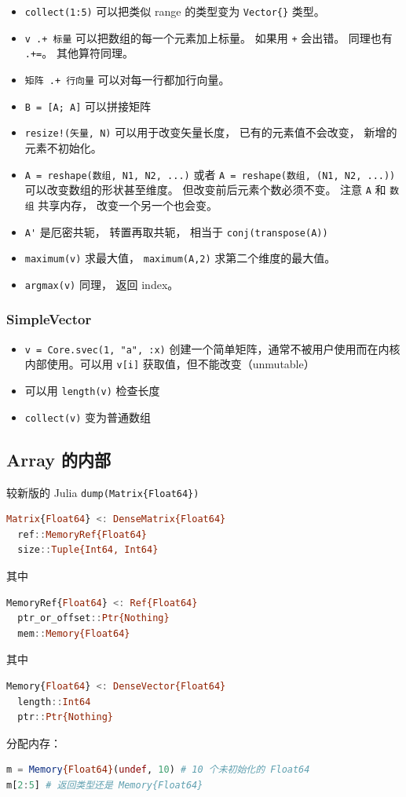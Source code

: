 \begin{itemize}
\item \verb`collect(1:5)` 可以把类似 range 的类型变为 \verb`Vector{}` 类型。
\item \verb`v .+ 标量` 可以把数组的每一个元素加上标量。 如果用 \verb`+` 会出错。 同理也有 \verb`.+=`。 其他算符同理。
\item \verb`矩阵 .+ 行向量` 可以对每一行都加行向量。
\item \verb`B = [A; A]` 可以拼接矩阵
\item \verb`resize!(矢量, N)` 可以用于改变矢量长度， 已有的元素值不会改变， 新增的元素不初始化。
\item \verb`A = reshape(数组, N1, N2, ...)` 或者 \verb`A = reshape(数组, (N1, N2, ...))` 可以改变数组的形状甚至维度。 但改变前后元素个数必须不变。 注意 \verb`A` 和 \verb`数组` 共享内存， 改变一个另一个也会变。
\item \verb`A'` 是厄密共轭， 转置再取共轭， 相当于 \verb`conj(transpose(A))`
\item \verb`maximum(v)` 求最大值， \verb`maximum(A,2)` 求第二个维度的最大值。
\item \verb`argmax(v)` 同理， 返回 index。
\end{itemize}

\subsubsection{SimpleVector}
\begin{itemize}
\item \verb`v = Core.svec(1, "a", :x)` 创建一个简单矩阵，通常不被用户使用而在内核内部使用。可以用 \verb`v[i]` 获取值，但不能改变（unmutable）
\item 可以用 \verb`length(v)` 检查长度
\item \verb`collect(v)` 变为普通数组
\end{itemize}


\subsection{Array 的内部}
较新版的 Julia \verb`dump(Matrix{Float64})`
\begin{lstlisting}[language=julia]
Matrix{Float64} <: DenseMatrix{Float64}
  ref::MemoryRef{Float64}
  size::Tuple{Int64, Int64}
\end{lstlisting}
其中
\begin{lstlisting}[language=julia]
MemoryRef{Float64} <: Ref{Float64}
  ptr_or_offset::Ptr{Nothing}
  mem::Memory{Float64}
\end{lstlisting}
其中
\begin{lstlisting}[language=julia]
Memory{Float64} <: DenseVector{Float64}
  length::Int64
  ptr::Ptr{Nothing}
\end{lstlisting}
分配内存：
\begin{lstlisting}[language=julia]
m = Memory{Float64}(undef, 10) # 10 个未初始化的 Float64
m[2:5] # 返回类型还是 Memory{Float64}
\end{lstlisting}

